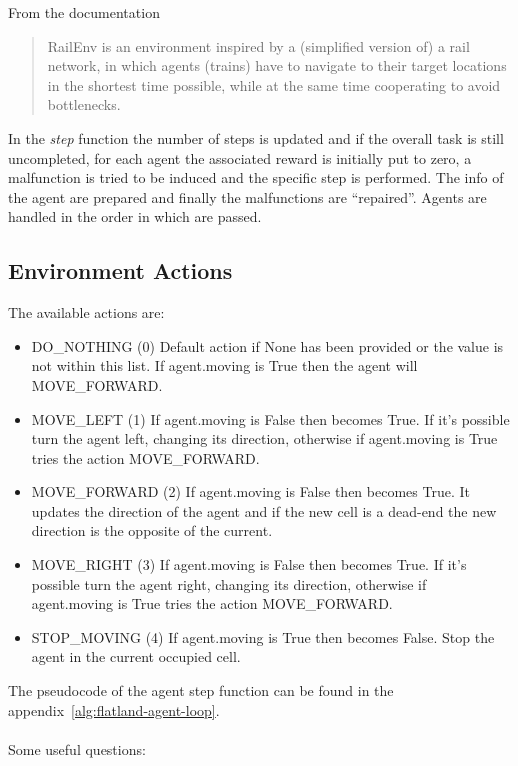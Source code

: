 \documentclass[11pt, a4paper, hidelinks]{report}
\begin{document}
From the documentation
\begin{quotation}
	RailEnv is an environment inspired by a (simplified version of) a rail network, in which agents (trains) have to navigate to their target
    locations in the shortest time possible, while at the same time cooperating to avoid bottlenecks.
\end{quotation}

In the \textit{step} function the number of steps is updated and if the overall task is still uncompleted, for each agent the associated reward is initially put to zero, a malfunction is tried to be induced and the specific step is performed.
The info of the agent are prepared and finally the malfunctions are ``repaired''.
Agents are handled in the order in which are passed.

\subsection{Environment Actions}\label{subsec:environment-actions}
The available actions are:
\begin{itemize}
	\item DO\_NOTHING (0) Default action if None has been provided or the value is not within this list.
If agent.moving is True then the agent will MOVE\_FORWARD\@.
    \item MOVE\_LEFT (1) If agent.moving is False then becomes True.
If it's possible turn the agent left, changing its direction, otherwise if agent.moving is True tries the action MOVE\_FORWARD\@.
    \item MOVE\_FORWARD (2) If agent.moving is False then becomes True.
It updates the direction of the agent and if the new cell is a dead-end the new direction is the opposite of the current.
    \item MOVE\_RIGHT (3) If agent.moving is False then becomes True.
If it's possible turn the agent right, changing its direction, otherwise if agent.moving is True tries the action MOVE\_FORWARD\@.
    \item STOP\_MOVING (4) If agent.moving is True then becomes False.
Stop the agent in the current occupied cell.
\end{itemize}
The pseudocode of the agent step function can be found in the appendix~\ref{alg:flatland-agent-loop}.
\\
\\
Some useful questions:
\end{document}
